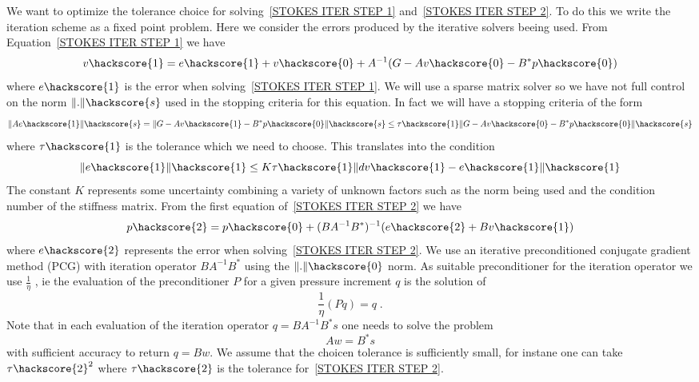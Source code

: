 We want to optimize the tolerance choice for solving~\ref{STOKES ITER STEP 1}
and~\ref{STOKES ITER STEP 2}. To do this we write the iteration scheme as a fixed point problem. Here
we consider the errors produced by the iterative solvers beeing used. 
From Equation~\ref{STOKES ITER STEP 1} we have 
\begin{equation} \label{STOKES total V1}
v\hackscore{1} = e\hackscore{1} + v\hackscore{0} + A^{-1} ( G - Av\hackscore{0} - B^{*} p\hackscore{0} ) 
\end{equation}
where $ e\hackscore{1}$ is the error when solving~\ref{STOKES ITER STEP 1}.  
We will use a sparse matrix solver so we have not full control on the norm $\|.\|\hackscore{s}$ used in the stopping criteria for this equation. In fact we will have a stopping criteria of the form 
\begin{equation} 
\| A e\hackscore{1} \|\hackscore{s}  = \| G - A v\hackscore{1} - B^{*} p\hackscore{0} \|\hackscore{s} \le \tau\hackscore{1} \| G - A v\hackscore{0} - B^{*} p\hackscore{0} \|\hackscore{s} 
\end{equation}
where $\tau\hackscore{1}$ is the tolerance which we need to choose. This translates into the condition
\begin{equation} 
\| e\hackscore{1} \|\hackscore{1} \le K \tau\hackscore{1} \| dv\hackscore{1} - e\hackscore{1} \|\hackscore{1} 
\end{equation}
The constant $K$ represents some uncertainty combining a variety of unknown factors such as the 
norm being used and the condition number of the stiffness matrix.  
From the first equation of~\ref{STOKES ITER STEP 2} we have
\begin{equation}\label{STOKES total P2}
p\hackscore{2} =  p\hackscore{0} + (B A^{-1} B^{*})^{-1} (e\hackscore{2} + Bv\hackscore{1} )
\end{equation}
where $e\hackscore{2}$ represents the error when solving~\ref{STOKES ITER STEP 2}.
We use an iterative preconditioned conjugate gradient method (PCG)  with iteration 
operator $B A^{-1} B^{*}$ using the $\|.\|\hackscore{0}$ norm. As suitable preconditioner  for the iteration
operator we use $\frac{1}{\eta}$ \cite{ELMAN}, ie 
the evaluation of the preconditioner $P$ for a given pressure increment $q$ is the solution of
\begin{equation} \label{STOKES P PREC}
\frac{1}{\eta} (Pq) = q \; . 
\end{equation}
Note that in each evaluation of the iteration operator $q=B A^{-1} B^{*} s$ one needs to solve
the problem
\begin{equation} \label{STOKES P OPERATOR}
A w = B^{*} s 
\end{equation}
with sufficient accuracy to return $q=Bw$. We assume that the choicen tolerance is 
sufficiently small, for instane one can take $\tau\hackscore{2}^2$ 
where $\tau\hackscore{2}$ is the tolerance for~\ref{STOKES ITER STEP 2}.

